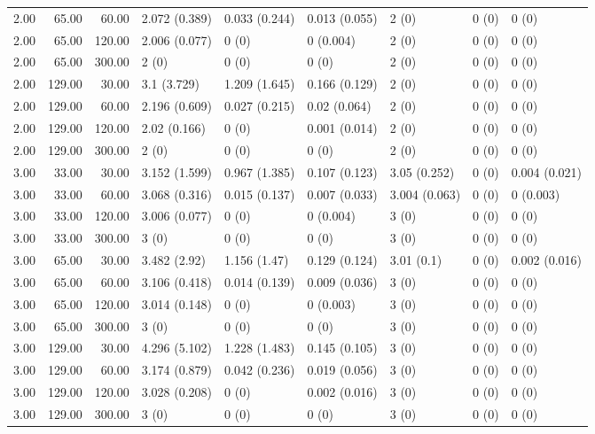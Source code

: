 \begin{table}[ht]
\begin{tabular}{rrrllllll}
  2.00 & 65.00 & 60.00 & 2.072 (0.389) & 0.033 (0.244) & 0.013 (0.055) & 2 (0) & 0 (0) & 0 (0) \\ 
  2.00 & 65.00 & 120.00 & 2.006 (0.077) & 0 (0) & 0 (0.004) & 2 (0) & 0 (0) & 0 (0) \\ 
  2.00 & 65.00 & 300.00 & 2 (0) & 0 (0) & 0 (0) & 2 (0) & 0 (0) & 0 (0) \\ 
  2.00 & 129.00 & 30.00 & 3.1 (3.729) & 1.209 (1.645) & 0.166 (0.129) & 2 (0) & 0 (0) & 0 (0) \\ 
  2.00 & 129.00 & 60.00 & 2.196 (0.609) & 0.027 (0.215) & 0.02 (0.064) & 2 (0) & 0 (0) & 0 (0) \\ 
  2.00 & 129.00 & 120.00 & 2.02 (0.166) & 0 (0) & 0.001 (0.014) & 2 (0) & 0 (0) & 0 (0) \\ 
  2.00 & 129.00 & 300.00 & 2 (0) & 0 (0) & 0 (0) & 2 (0) & 0 (0) & 0 (0) \\ 
  3.00 & 33.00 & 30.00 & 3.152 (1.599) & 0.967 (1.385) & 0.107 (0.123) & 3.05 (0.252) & 0 (0) & 0.004 (0.021) \\ 
  3.00 & 33.00 & 60.00 & 3.068 (0.316) & 0.015 (0.137) & 0.007 (0.033) & 3.004 (0.063) & 0 (0) & 0 (0.003) \\ 
  3.00 & 33.00 & 120.00 & 3.006 (0.077) & 0 (0) & 0 (0.004) & 3 (0) & 0 (0) & 0 (0) \\ 
  3.00 & 33.00 & 300.00 & 3 (0) & 0 (0) & 0 (0) & 3 (0) & 0 (0) & 0 (0) \\ 
  3.00 & 65.00 & 30.00 & 3.482 (2.92) & 1.156 (1.47) & 0.129 (0.124) & 3.01 (0.1) & 0 (0) & 0.002 (0.016) \\ 
  3.00 & 65.00 & 60.00 & 3.106 (0.418) & 0.014 (0.139) & 0.009 (0.036) & 3 (0) & 0 (0) & 0 (0) \\ 
  3.00 & 65.00 & 120.00 & 3.014 (0.148) & 0 (0) & 0 (0.003) & 3 (0) & 0 (0) & 0 (0) \\ 
  3.00 & 65.00 & 300.00 & 3 (0) & 0 (0) & 0 (0) & 3 (0) & 0 (0) & 0 (0) \\ 
  3.00 & 129.00 & 30.00 & 4.296 (5.102) & 1.228 (1.483) & 0.145 (0.105) & 3 (0) & 0 (0) & 0 (0) \\ 
  3.00 & 129.00 & 60.00 & 3.174 (0.879) & 0.042 (0.236) & 0.019 (0.056) & 3 (0) & 0 (0) & 0 (0) \\ 
  3.00 & 129.00 & 120.00 & 3.028 (0.208) & 0 (0) & 0.002 (0.016) & 3 (0) & 0 (0) & 0 (0) \\ 
  3.00 & 129.00 & 300.00 & 3 (0) & 0 (0) & 0 (0) & 3 (0) & 0 (0) & 0 (0) \\ 
   \hline
\end{tabular}
\end{table}
